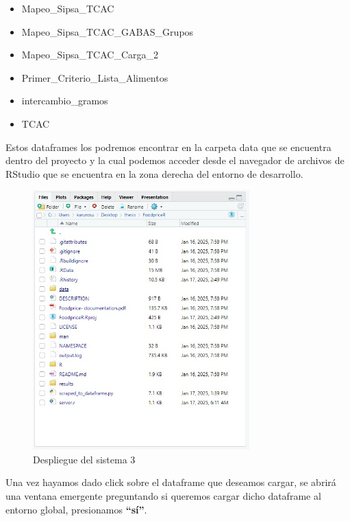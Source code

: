 \begin{itemize}
    \item Mapeo\_Sipsa\_TCAC
    \item Mapeo\_Sipsa\_TCAC\_GABAS\_Grupos
    \item Mapeo\_Sipsa\_TCAC\_Carga\_2
    \item Primer\_Criterio\_Lista\_Alimentos
    \item intercambio\_gramos
    \item TCAC
\end{itemize}


Estos dataframes los podremos encontrar en la carpeta data que se encuentra dentro del proyecto y la cual podemos acceder desde el navegador de archivos de RStudio que se encuentra en la zona derecha del entorno de desarrollo.


\begin{figure}[H]
    \centering
    \includegraphics[height=10cm]{img/despliegue/despliegue2.jpeg}
    \caption{Despliegue del sistema 3}
    \label{fig:despliegue3}
\end{figure}


Una vez hayamos dado click sobre el dataframe que deseamos cargar, se abrir\'a una ventana emergente preguntando si queremos cargar dicho dataframe al entorno global, presionamos \textbf{``s\'i''}.

